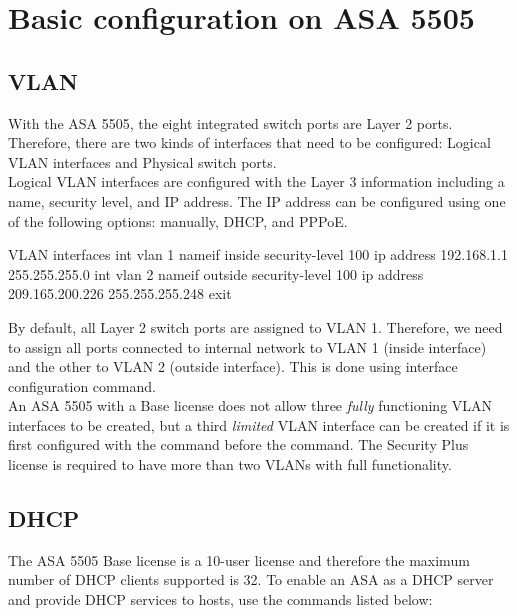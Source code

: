 \section{Basic configuration on ASA 5505}

\subsection{VLAN}

With the ASA 5505, the eight integrated switch ports are Layer 2 ports. Therefore, there are two kinds of interfaces that need to be configured: Logical VLAN interfaces and Physical switch ports. \\

Logical VLAN interfaces are configured with the Layer 3 information including a name, security level, and IP address. The IP address can be configured using one of the following options: manually, DHCP, and PPPoE. 

\begin{sexylisting}{VLAN interfaces}
int vlan 1
	nameif inside
	security-level 100
	ip address 192.168.1.1 255.255.255.0
int vlan 2
	nameif outside
	security-level 100
	ip address 209.165.200.226 255.255.255.248
	exit
\end{sexylisting}

By default, all Layer 2 switch ports are assigned to VLAN 1. Therefore, we need to assign all ports connected to internal network to VLAN 1 (inside interface) and the other to VLAN 2 (outside interface). This is done using   interface configuration command. \\

An ASA 5505 with a Base license does not allow three \textit{fully} functioning VLAN interfaces to be created, but a third \textit{limited} VLAN interface can be created if it is first configured with the  command before the  command. The Security Plus license is required to have more than two VLANs with full functionality.\\

\subsection{DHCP}

The ASA 5505 Base license is a 10-user license and therefore the maximum number of DHCP clients supported is 32. To enable an ASA as a DHCP server and provide DHCP services to hosts, use the commands listed below:

